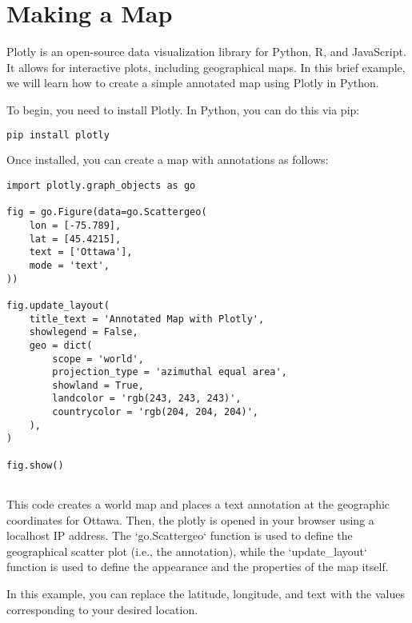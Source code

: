 \chapter{Making a Map}


Plotly is an open-source data visualization library for Python, R, and
JavaScript. It allows for interactive plots, including geographical
maps. In this brief example, we will learn how to create a simple
annotated map using Plotly in Python.

To begin, you need to install Plotly. In Python, you can do this via pip:

\begin{lstlisting}[language=Python]
pip install plotly
\end{lstlisting}

Once installed, you can create a map with annotations as follows:


\begin{verbatim}
import plotly.graph_objects as go

fig = go.Figure(data=go.Scattergeo(
    lon = [-75.789], 
    lat = [45.4215],
    text = ['Ottawa'],
    mode = 'text',
))

fig.update_layout(
    title_text = 'Annotated Map with Plotly',
    showlegend = False,
    geo = dict(
        scope = 'world',
        projection_type = 'azimuthal equal area',
        showland = True,
        landcolor = 'rgb(243, 243, 243)',
        countrycolor = 'rgb(204, 204, 204)',
    ),
)

fig.show()


\end{verbatim}
This code creates a world map and places a text annotation at the
geographic coordinates for Ottawa. Then, the plotly is opened in your browser using a localhost IP address. 
The `go.Scattergeo` function is
used to define the geographical scatter plot (i.e., the annotation),
while the `update\_layout` function is used to define the appearance
and the properties of the map itself.

In this example, you can replace the latitude, longitude, and text
with the values corresponding to your desired location.
